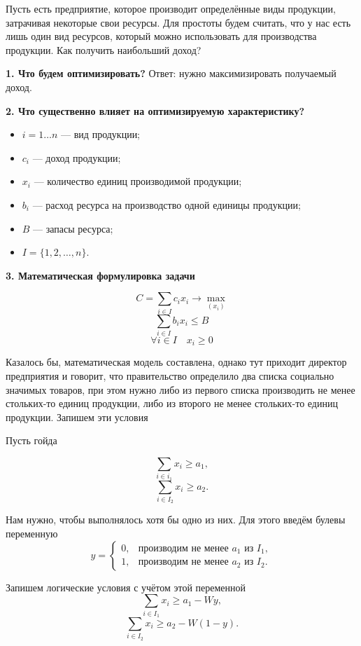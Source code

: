 Пусть есть предприятие, которое производит определённые виды продукции, затрачивая некоторые свои ресурсы. Для простоты будем считать, что у нас есть лишь один вид ресурсов, который можно использовать для производства продукции. Как получить наибольший доход?

\textbf{1. Что будем оптимизировать?} Ответ: нужно максимизировать получаемый доход.

\textbf{2. Что существенно влияет на оптимизируемую характеристику?}

\begin{itemize}[nosep]
	\item $i = 1 \dots n$ --- вид продукции;
	
	\item $c_i$ --- доход продукции;
	
	\item $x_i$ --- количество единиц производимой продукции;
	
	\item $b_i$ --- расход ресурса на производство одной единицы продукции;
	
	\item $B$ --- запасы ресурса;
	
	\item $I = \{1, 2, \dots, n\}$.
\end{itemize}

\textbf{3. Математическая формулировка задачи}

\[
C = \sum_{i \in I}c_i x_i \to \max_{(x_i)}
\]
\[
\sum_{i \in I}b_i x_i \le B
\]
\[
\forall i \in I \quad x_i \ge 0
\]

Казалось бы, математическая модель составлена, однако тут приходит директор предприятия и говорит, что правительство определило два списка социально значимых товаров, при этом нужно либо из первого списка производить не менее стольких-то единиц продукции, либо из второго не менее стольких-то единиц продукции. Запишем эти условия

Пусть гойда

\[
\sum_{i \in i_1} x_i \ge a_1,
\]
\[
\sum_{i \in I_2} x_i \ge a_2.
\]

Нам нужно, чтобы выполнялось хотя бы одно из них. Для этого введём булевы переменную
\[
y = \begin{cases}
	0, & \text{производим не менее $a_1$ из $I_1$}, \\
	1, & \text{производим не менее $a_2$ из $I_2$}.
\end{cases}
\]

Запишем логические условия с учётом этой переменной
\[
\sum_{i \in I_1} x_i \ge a_1 - Wy,
\]
\[
\sum_{i \in I_2} x_i \ge a_2 - W(1 - y).
\]

